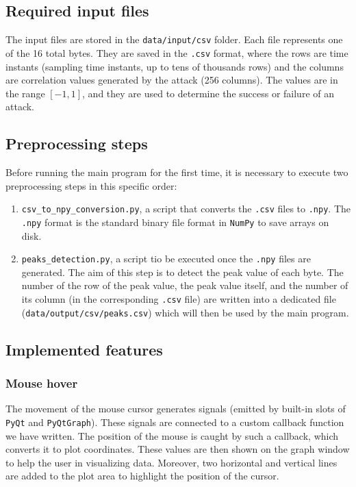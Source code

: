 \documentclass[11pt,a4paper]{article}
\begin{document}
\subsection{Required input files}
The input files are stored in the \texttt{data/input/csv} folder. Each file represents one of the 16 total bytes.
They are saved in the \texttt{.csv} format, where the rows are time instants (sampling time instants, up to tens of thousands rows) and the columns are correlation values generated by the attack (256 columns).
The values are in the range $[-1, 1]$, and they are used to determine the success or failure of an attack.

\subsection{Preprocessing steps}
Before running the main program for the first time, it is necessary to execute two preprocessing steps in this specific order:
\begin{enumerate}
    \item \texttt{csv\_to\_npy\_conversion.py}, a script that converts the \texttt{.csv} files to \texttt{.npy}. The \texttt{.npy} format is the standard binary file format in \texttt{NumPy} to save arrays on disk.
    \item \texttt{peaks\_detection.py}, a script tio be executed once the \texttt{.npy} files are generated. The aim of this step is to detect the peak value of each byte. The number of the row of the peak value, the peak value itself, and the number of its column (in the corresponding \texttt{.csv} file) are written into a dedicated file (\texttt{data/output/csv/peaks.csv}) which will then be used by the main program.
\end{enumerate}

\subsection{Implemented features}
\subsubsection{Mouse hover}
The movement of the mouse cursor generates signals (emitted by built-in slots of \texttt{PyQt} and \texttt{PyQtGraph}).
These signals are connected to a custom callback function we have written.
The position of the mouse is caught by such a callback, which converts it to plot coordinates.
These values are then shown on the graph window to help the user in visualizing data.
Moreover, two horizontal and vertical lines are added to the plot area to highlight the position of the cursor.
\end{document}
